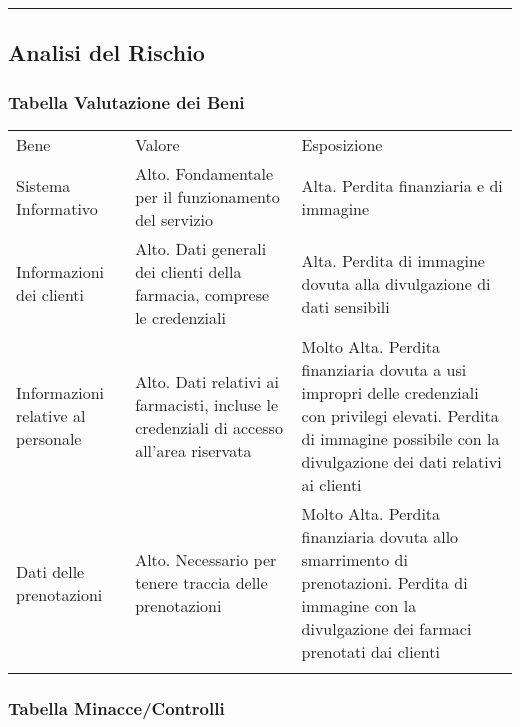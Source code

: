 \begin{center}\rule{3in}{0.4pt}\end{center}

\subsection{Analisi del Rischio}\label{analisi-del-rischio}

\subsubsection{Tabella Valutazione dei
Beni}\label{tabella-valutazione-dei-beni}

\begin{longtable}[c]{@{}lll@{}}
\toprule\addlinespace
Bene & Valore & Esposizione
\\\addlinespace
\midrule\endhead
Sistema Informativo & Alto. Fondamentale per il funzionamento del
servizio & Alta. Perdita finanziaria e di immagine
\\\addlinespace
Informazioni dei clienti & Alto. Dati generali dei clienti della
farmacia, comprese le credenziali & Alta. Perdita di immagine dovuta
alla divulgazione di dati sensibili
\\\addlinespace
Informazioni relative al personale & Alto. Dati relativi ai farmacisti,
incluse le credenziali di accesso all'area riservata & Molto Alta.
Perdita finanziaria dovuta a usi impropri delle credenziali con
privilegi elevati. Perdita di immagine possibile con la divulgazione dei
dati relativi ai clienti
\\\addlinespace
Dati delle prenotazioni & Alto. Necessario per tenere traccia delle
prenotazioni & Molto Alta. Perdita finanziaria dovuta allo smarrimento
di prenotazioni. Perdita di immagine con la divulgazione dei farmaci
prenotati dai clienti
\\\addlinespace
\bottomrule
\end{longtable}

\subsubsection{Tabella
Minacce/Controlli}\label{tabella-minaccecontrolli}

